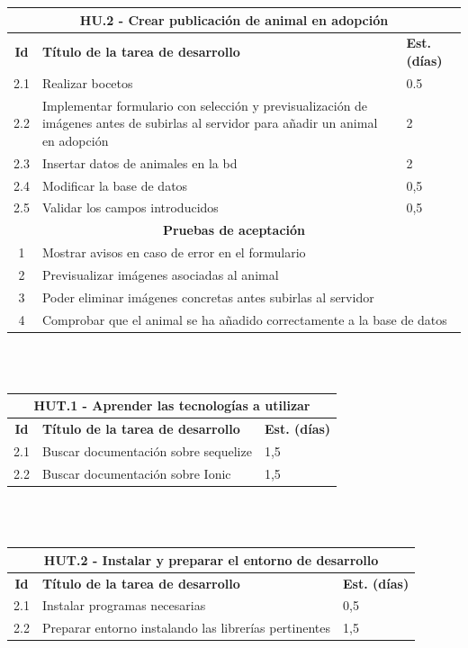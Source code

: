 \begin{tabular}{|c|p{9.5cm}|p{1cm}|}
	\hline
	\multicolumn{3}{|c|}{\textbf{HU.2 - Crear publicación de animal en adopción}} \\
	\hline
	\textbf{Id} & \textbf{Título de la tarea de desarrollo} & \textbf{Est. (días)} \\ %
	\hline
	2.1 & Realizar bocetos & 0.5 \\ \hline
	2.2 &  Implementar formulario con selección y previsualización de imágenes antes de subirlas al servidor para añadir un animal en adopción & 2 \\ \hline
	2.3 &  Insertar datos de animales en la bd & 2 \\ \hline
	2.4 & Modificar la base de datos & 0,5 \\ \hline
	2.5 & Validar los campos introducidos & 0,5 \\ \hline
	\multicolumn{3}{|c|}{\textbf{Pruebas de aceptación}} \\ \hline
	1 & \multicolumn{2}{|l|}{Mostrar avisos en caso de error en el formulario} \\ \hline
	2 & \multicolumn{2}{|l|}{Previsualizar imágenes asociadas al animal} \\ \hline
	3 & \multicolumn{2}{|l|}{Poder eliminar imágenes concretas antes subirlas al servidor} \\\hline
	4 & \multicolumn{2}{|l|}{Comprobar que el animal se ha añadido correctamente a la base de datos} \\\hline
	
\end{tabular} \\ \\


\begin{tabular}{|c|p{9.5cm}|p{1cm}|}
	\hline
	\multicolumn{3}{|c|}{\textbf{HUT.1 - Aprender las tecnologías a utilizar}} \\
	\hline
	\textbf{Id} & \textbf{Título de la tarea de desarrollo} & \textbf{Est. (días)} \\
	\hline
	2.1 & Buscar documentación sobre sequelize & 1,5 \\ \hline
	2.2 & Buscar documentación sobre Ionic & 1,5 \\ \hline
\end{tabular} \\ \\

\begin{tabular}{|c|p{9.5cm}|p{1cm}|}
	\hline
	\multicolumn{3}{|c|}{\textbf{HUT.2 - Instalar y preparar el entorno de desarrollo}} \\
	\hline
	\textbf{Id} & \textbf{Título de la tarea de desarrollo} & \textbf{Est. (días)} \\
	\hline
	2.1 & Instalar programas necesarias & 0,5 \\ \hline
	2.2 & Preparar entorno instalando las librerías pertinentes & 1,5 \\ \hline
\end{tabular} \\ \\


